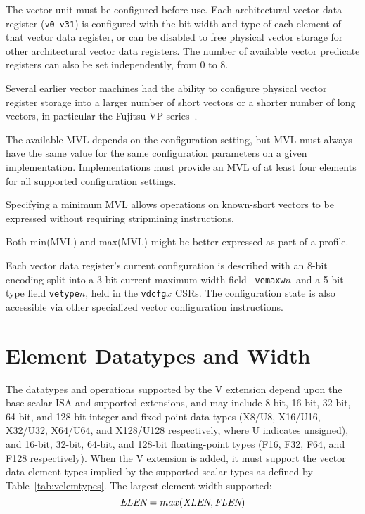 The vector unit must be configured before use.  Each architectural
vector data register ({\tt v0}--{\tt v31}) is configured with the bit
width and type of each element of that vector data register, or can be
disabled to free physical vector storage for other architectural
vector data registers.  The number of available vector predicate
registers can also be set independently, from 0 to 8.

\begin{commentary}
  Several earlier vector machines had the ability to configure
  physical vector register storage into a larger number of short
   vectors or a shorter number of long vectors, in particular the
  Fujitsu VP series~\cite{vp200}.
\end{commentary}

The available MVL depends on the configuration setting, but MVL must
always have the same value for the same configuration parameters on a
given implementation.  Implementations must provide an MVL of at least
four elements for all supported configuration settings.

\begin{commentary}
  Specifying a minimum MVL allows operations on known-short vectors to
  be expressed without requiring stripmining instructions.
\end{commentary}

\begin{discussion}
Both min(MVL) and max(MVL) might be better expressed as part of a
profile.
\end{discussion}

Each vector data register's current configuration is described with an
8-bit encoding split into a 3-bit current maximum-width field {\tt
  vemaxw}$n$\, and a 5-bit type field {\tt vetype}$n$, held in the
{\tt vdcfg}$x$ CSRs.  The configuration state is also accessible via
other specialized vector configuration instructions.

\section{Element Datatypes and Width}

The datatypes and operations supported by the V extension depend upon
the base scalar ISA and supported extensions, and may include 8-bit,
16-bit, 32-bit, 64-bit, and 128-bit integer and fixed-point data types
(X8/U8, X16/U16, X32/U32, X64/U64, and X128/U128 respectively,
where U indicates unsigned), and 16-bit, 32-bit, 64-bit,
and 128-bit floating-point types (F16, F32, F64, and F128
respectively).  When the V extension is added, it must support the
vector data element types implied by the supported scalar types as
defined by Table~\ref{tab:velemtypes}.  The largest element width
supported:
\[ \mbox{\em ELEN} = max(\mbox{\em XLEN}, \mbox{\em FLEN}) \]

